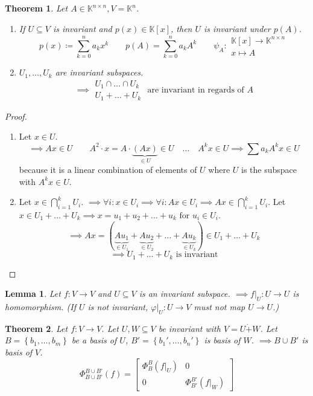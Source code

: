 \documentclass{article}
\newtheorem{theorem}{Theorem}  \numberwithin{theorem}{section}
\newtheorem{lemma}{Lemma}  \numberwithin{lemma}{section}
\newcommand{\set}[1]{\left\{#1\right\}}
\begin{document}
\begin{theorem} %
  \label{s113}
  Let $A \in \mathbb K^{n\times n}, V = \mathbb K^n$.
  \begin{enumerate}
    \item If $U \subseteq V$ is invariant and $p(x) \in \mathbb K[x]$, then $U$ is invariant under $p(A)$.
      \[
        p(x) \coloneqq \sum_{k=0}^n a_k x^k 
        \qquad p(A) = \sum_{k=0}^n a_k A^k
        \qquad \psi_A: \substack{\mathbb K[x] \to \mathbb K^{n\times n} \\ x \mapsto A}
      \]
    \item $U_1, \dots, U_k$ are invariant subspaces.
      \[ \implies \substack{U_1 \cap \dots \cap U_k \\ U_1 + \dots + U_k} \text{ are invariant in regards of } A \]
  \end{enumerate}
\end{theorem}

\begin{proof}
  \begin{enumerate}
    \item Let $x \in U$.
      \[ \implies Ax \in U \qquad A^2 \cdot x = A \cdot \underbrace{(Ax)}_{\in U} \in U \quad \dots \quad A^k x \in U \implies \sum a_k A^k x \in U \]
      because it is a linear combination of elements of $U$ where $U$ is the subspace with $A^k x \in U$.
    \item Let $x \in \bigcap_{i=1}^k U_i$. $\implies \forall i: x \in U_i \implies \forall i: Ax \in U_i \implies Ax \in \bigcap_{i=1}^k U_i$.
      Let $x \in U_1 + \dots + U_k \implies x = u_1 + u_2 + \dots + u_k \text{ for } u_i \in U_i$.
      \[ \implies Ax = (\underbrace{Au_1}_{\in U_1} + \underbrace{Au_2}_{\in U_2} + \dots + \underbrace{Au_k}_{\in U_k}) \in U_1 + \dots + U_k \]
      \[ \implies U_1 + \dots + U_k \text{ is invariant} \]
  \end{enumerate}
\end{proof}

\begin{lemma} %
  Let $f: V \to V$ and $U \subseteq V$ is an invariant subspace.
  $\implies f|_U: U \to U$ is homomorphism.
  (If $U$ is not invariant, $\varphi|_U: U \to V$ must not map $U \to U$.)
\end{lemma}

\begin{theorem} %
  Let $f: V \to V$. Let $U, W \subseteq V$ be invariant with $V = U \dot+ W$.
  Let $B = \set{b_1, \dots, b_m}$ be a basis of $U$, $B' = \set{b_1', \dots, b_n'}$ is basis of $W$.
  $\implies B \cup B'$ is basis of $V$.
  \[
    \Phi_{B\cup B'}^{B\cup B'}(f) = \left[\begin{array}{c|c}
      \Phi_B^B(f|_U) & 0 \\
    \hline
      0 & \Phi_{B'}^{B'}(f|_W)
    \end{array}\right]
  \]
\end{theorem}
\end{document}
